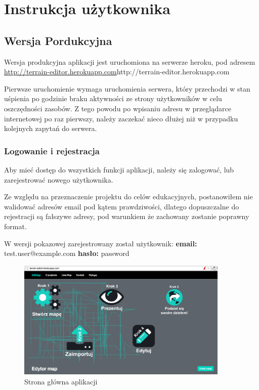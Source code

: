 \chapter{Instrukcja użytkownika}

\section{Wersja Pordukcyjna}
Wersja produkcyjna aplikacji jest uruchomiona na serwerze heroku, pod adresem \url{http://terrain-editor.herokuapp.com}{http://terrain-editor.herokuapp.com}

Pierwsze uruchomienie wymaga uruchomienia serwera, który przechodzi w stan uśpienia po godzinie braku aktywności ze strony użytkowników w celu oszczędności zasobów. Z tego powodu po wpisaniu adresu w przeglądarce internetowej po raz pierwszy, należy zaczekać nieco dłużej niż w przypadku kolejnych zapytań do serwera.

\subsection{Logowanie i rejestracja}
Aby mieć dostęp do wszystkich funkcji aplikacji, należy się zalogować, lub zarejestrować nowego użytkownika.

Ze względu na przeznaczenie projektu do celów edukacyjnych, postanowiłem nie walidować adresów email pod kątem prawdziwości, dlatego dopuszczalne do rejestracji są fałszywe adresy, pod warunkiem że zachowany zostanie poprawny format.

W wersji pokazowej zarejestrowany został użytkownik:
\textbf{email:} test.user@example.com
\textbf{hasło:} password

\FloatBarrier
 	\begin{figure}[ht]
        \centering
        \includegraphics[width=0.90\textwidth,height=0.46\textheight]{img/home.png}
	\caption{Strona główna aplikacji}
        \label{rys:screen_home}
    \end{figure}
\FloatBarrier
	
